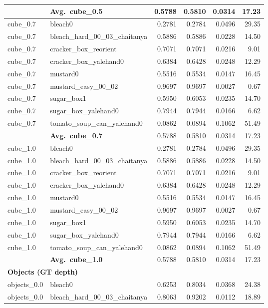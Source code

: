 \begin{longtable}{llrrrr}
  \cmidrule{2-6}
  & \textbf{Avg.~cube_0.5} & 0.5788 & 0.5810 & 0.0314 & 17.23 \\
  \midrule
  cube_0.7 & bleach0 & 0.2781 & 0.2784 & 0.0496 & 29.35 \\
  cube_0.7 & bleach\_hard\_00\_03\_chaitanya & 0.5886 & 0.5886 & 0.0228 & 14.50 \\
  cube_0.7 & cracker\_box\_reorient & 0.7071 & 0.7071 & 0.0216 & 9.01 \\
  cube_0.7 & cracker\_box\_yalehand0 & 0.6384 & 0.6428 & 0.0248 & 12.29 \\
  cube_0.7 & mustard0 & 0.5516 & 0.5534 & 0.0147 & 16.45 \\
  cube_0.7 & mustard\_easy\_00\_02 & 0.9697 & 0.9697 & 0.0027 & 0.67 \\
  cube_0.7 & sugar\_box1 & 0.5950 & 0.6053 & 0.0235 & 14.70 \\
  cube_0.7 & sugar\_box\_yalehand0 & 0.7944 & 0.7944 & 0.0166 & 6.62 \\
  cube_0.7 & tomato\_soup\_can\_yalehand0 & 0.0862 & 0.0894 & 0.1062 & 51.49 \\
  \cmidrule{2-6}
  & \textbf{Avg.~cube_0.7} & 0.5788 & 0.5810 & 0.0314 & 17.23 \\
  \midrule
  cube_1.0 & bleach0 & 0.2781 & 0.2784 & 0.0496 & 29.35 \\
  cube_1.0 & bleach\_hard\_00\_03\_chaitanya & 0.5886 & 0.5886 & 0.0228 & 14.50 \\
  cube_1.0 & cracker\_box\_reorient & 0.7071 & 0.7071 & 0.0216 & 9.01 \\
  cube_1.0 & cracker\_box\_yalehand0 & 0.6384 & 0.6428 & 0.0248 & 12.29 \\
  cube_1.0 & mustard0 & 0.5516 & 0.5534 & 0.0147 & 16.45 \\
  cube_1.0 & mustard\_easy\_00\_02 & 0.9697 & 0.9697 & 0.0027 & 0.67 \\
  cube_1.0 & sugar\_box1 & 0.5950 & 0.6053 & 0.0235 & 14.70 \\
  cube_1.0 & sugar\_box\_yalehand0 & 0.7944 & 0.7944 & 0.0166 & 6.62 \\
  cube_1.0 & tomato\_soup\_can\_yalehand0 & 0.0862 & 0.0894 & 0.1062 & 51.49 \\
  \cmidrule{2-6}
  & \textbf{Avg.~cube_1.0} & 0.5788 & 0.5810 & 0.0314 & 17.23 \\
  \midrule
\multicolumn{6}{l}{\textbf{Objects (GT depth)}} \\
\midrule
  objects_0.0 & bleach0 & 0.6253 & 0.8034 & 0.0368 & 24.38 \\
  objects_0.0 & bleach\_hard\_00\_03\_chaitanya & 0.8063 & 0.9202 & 0.0112 & 18.89 \\

\end{longtable}
